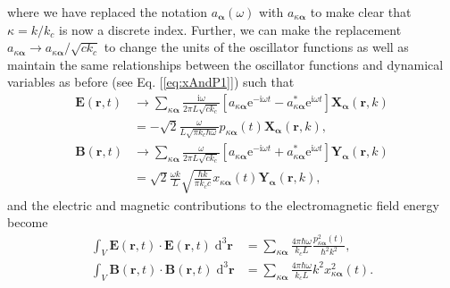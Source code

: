 \documentclass{article}
\numberwithin{equation}{section}
\begin{document}
where we have replaced the notation $a_{\bm{\alpha}}(\omega)$ with $a_{\kappa\bm{\alpha}}$ to make clear that $\kappa = k/k_c$ is now a discrete index. Further, we can make the replacement $a_{\kappa\bm{\alpha}}\to a_{\kappa\bm{\alpha}}/\sqrt{ck_c}$ to change the units of the oscillator functions as well as maintain the same relationships between the oscillator functions and dynamical variables as before (see Eq. [\ref{eq:xAndP1}]) such that 
\begin{equation}
\begin{split}
\mathbf{E}(\mathbf{r},t) &\to \sum_{\kappa\bm{\alpha}}\frac{\mathrm{i}\omega}{2\pi L\sqrt{ck_c}}\left[a_{\kappa\bm{\alpha}}\mathrm{e}^{-\mathrm{i}\omega t} - a_{\kappa\bm{\alpha}}^*\mathrm{e}^{\mathrm{i}\omega t}\right]\mathbf{X}_{\bm{\alpha}}(\mathbf{r},k)\\
&= -\sqrt{2}\frac{\omega}{L\sqrt{\pi k_c\hbar\omega}}p_{\kappa\bm{\alpha}}(t)\mathbf{X}_{\bm{\alpha}}(\mathbf{r},k),\\[0.5em]
\mathbf{B}(\mathbf{r},t) &\to \sum_{\kappa\bm{\alpha}}\frac{\omega}{2\pi L\sqrt{ck_c}}\left[a_{\kappa\bm{\alpha}}\mathrm{e}^{-\mathrm{i}\omega t} + a_{\kappa\bm{\alpha}}^*\mathrm{e}^{\mathrm{i}\omega t}\right]\mathbf{Y}_{\bm{\alpha}}(\mathbf{r},k)\\
&= \sqrt{2}\frac{\omega k}{L}\sqrt{\frac{\hbar k}{\pi k_cc}}x_{\kappa\bm{\alpha}}(t)\mathbf{Y}_{\bm{\alpha}}(\mathbf{r},k),
\end{split}
\end{equation}
and the electric and magnetic contributions to the electromagnetic field energy become
\begin{equation}
\begin{split}
\int_V\mathbf{E}(\mathbf{r},t)\cdot\mathbf{E}(\mathbf{r},t)\;\mathrm{d}^3\mathbf{r} &= \sum_{\kappa\bm{\alpha}}\frac{4\pi\hbar \omega}{k_cL}\frac{p^2_{\kappa\bm{\alpha}}(t)}{\hbar^2k^2},\\
\int_V\mathbf{B}(\mathbf{r},t)\cdot\mathbf{B}(\mathbf{r},t)\;\mathrm{d}^3\mathbf{r} &= \sum_{\kappa\bm{\alpha}}\frac{4\pi\hbar \omega}{k_cL}k^2x^2_{\kappa\bm{\alpha}}(t).
\end{split}
\end{equation}
\end{document}

